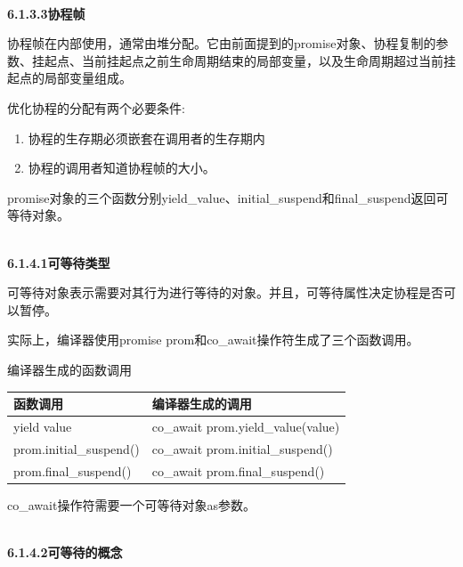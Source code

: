 \hspace*{\fill} \\ %
\noindent
\textbf{6.1.3.3\hspace{0.2cm}协程帧}

协程帧在内部使用，通常由堆分配。它由前面提到的promise对象、协程复制的参数、挂起点、当前挂起点之前生命周期结束的局部变量，以及生命周期超过当前挂起点的局部变量组成。

优化协程的分配有两个必要条件:

\begin{enumerate}
\item 
协程的生存期必须嵌套在调用者的生存期内

\item 
协程的调用者知道协程帧的大小。

\end{enumerate}


promise对象的三个函数分别yield\_value、initial\_suspend和final\_suspend返回可等待对象。

\hspace*{\fill} \\ %
\noindent
\textbf{6.1.4.1\hspace{0.2cm}可等待类型}

可等待对象表示需要对其行为进行等待的对象。并且，可等待属性决定协程是否可以暂停。

实际上，编译器使用promise prom和co\_await操作符生成了三个函数调用。

\begin{center}
编译器生成的函数调用
\end{center}

\begin{table}[H]
\centering
\begin{tabular}{ll}
\textbf{函数调用}           & \textbf{编译器生成的调用}   \\ \hline
yield value             & co\_await prom.yield\_value(value) \\
prom.initial\_suspend() & co\_await prom.initial\_suspend()  \\
prom.final\_suspend()   & co\_await prom.final\_suspend()   
\end{tabular}
\end{table}

co\_await操作符需要一个可等待对象as参数。

\hspace*{\fill} \\ %
\noindent
\textbf{6.1.4.2\hspace{0.2cm}可等待的概念}

